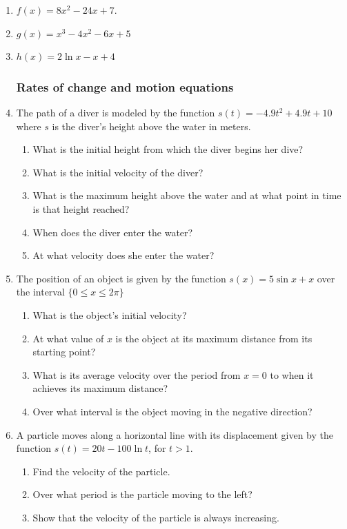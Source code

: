 \documentclass[12pt, oneside]{article}
\begin{document}
\begin{enumerate}
\item $f(x) = 8x^2-24x+7$.
\item $g(x) = x^3-4x^2-6x+5$
\item $h(x) = 2\ln x - x+4$


\subsubsection*{Rates of change and motion equations}

\item The path of a diver is modeled by the function $s(t)=-4.9t^2+4.9t+10$ where $s$ is the diver's height above the water in meters. 
\begin{enumerate}
    \item What is the initial height from which the diver begins her dive?
    \item What is the initial velocity of the diver?
    \item What is the maximum height above the water and at what point in time is that height reached?
    \item When does the diver enter the water? 
    \item At what velocity does she enter the water?
\end{enumerate}

\item The position of an object is given by the function $s(x) = 5\sin x +x$ over the interval $\{0\leq x  \leq 2\pi \}$
\begin{enumerate}
    \item What is the object's initial velocity?
    \item At what value of $x$ is the object at its maximum distance from its starting point? 
    \item What is its average velocity over the period from $x=0$ to when it achieves its maximum distance? 
    \item Over what interval is the object moving in the negative direction?
\end{enumerate}


\item A particle moves along a horizontal line with its displacement given by the function $s(t) = 20t - 100 \ln{t}$, for $t>1$.
\begin{enumerate}
    \item Find the velocity of the particle.
    \item Over what period is the particle moving to the left?
    \item Show that the velocity of the particle is always increasing.
\end{enumerate}


\end{enumerate}
\end{document}
